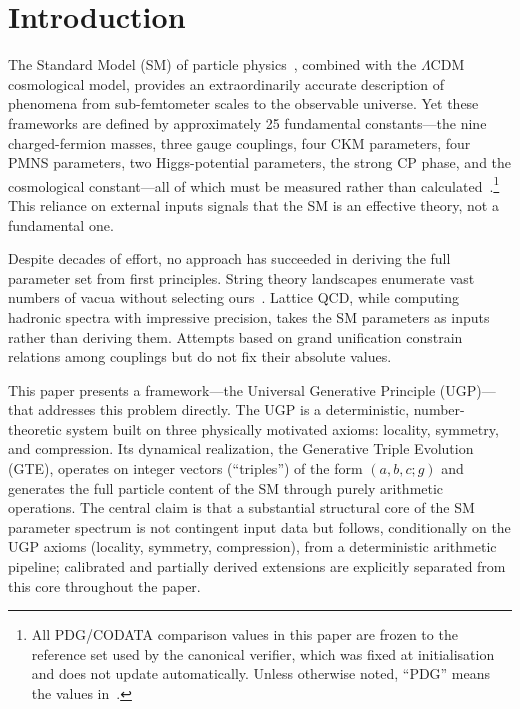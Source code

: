 \documentclass[11pt]{article}
\theoremstyle{remark}
\newcommand{\triple}{(a,b,c;g)}
\begin{document}
\section{Introduction}
\label{sec:introduction}

The Standard Model (SM) of particle physics~\cite{Glashow1961,Weinberg1967}, combined with the $\Lambda$CDM cosmological model, provides an extraordinarily accurate description of phenomena from sub-femtometer scales to the observable universe.
Yet these frameworks are defined by approximately 25 fundamental constants---the nine charged-fermion masses, three gauge couplings, four CKM parameters, four PMNS parameters, two Higgs-potential parameters, the strong CP phase, and the cosmological constant---all of which must be measured rather than calculated~\cite{ParticleDataGroup2022}.\footnote{All PDG/CODATA comparison values in this paper are frozen to the reference set used by the canonical verifier, which was fixed at initialisation and does not update automatically. Unless otherwise noted, ``PDG'' means the values in~\cite{ParticleDataGroup2022}.}
This reliance on external inputs signals that the SM is an effective theory, not a fundamental one.

Despite decades of effort, no approach has succeeded in deriving the full parameter set from first principles.
String theory landscapes enumerate vast numbers of vacua without selecting ours~\cite{Susskind1995}.
Lattice QCD, while computing hadronic spectra with impressive precision, takes the SM parameters as inputs rather than deriving them.
Attempts based on grand unification constrain relations among couplings but do not fix their absolute values.

This paper presents a framework---the Universal Generative Principle (UGP)---that addresses this problem directly.
The UGP is a deterministic, number-theoretic system built on three physically motivated axioms: locality, symmetry, and compression.
Its dynamical realization, the Generative Triple Evolution (GTE), operates on integer vectors (``triples'') of the form $\triple$ and generates the full particle content of the SM through purely arithmetic operations.
The central claim is that a substantial structural core of the SM parameter spectrum is not contingent input data but follows, conditionally on the UGP axioms (locality, symmetry, compression), from a deterministic arithmetic pipeline; calibrated and partially derived extensions are explicitly separated from this core throughout the paper.
\end{document}
